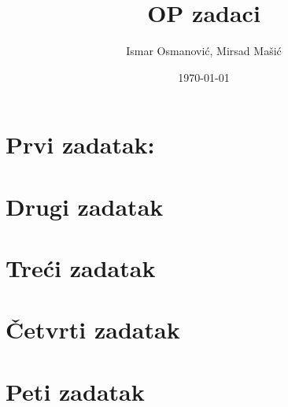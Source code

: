 \documentclass[a4paper, 12pt]{article}
\title{\huge OP zadaci}
\author{Ismar Osmanović, Mirsad Mašić}
\date{\today}
\begin{document}
\maketitle

\section {Prvi zadatak:}


\pagebreak

\section {Drugi zadatak}



\section {Treći zadatak}




\pagebreak

\section {Četvrti zadatak}



\section {Peti zadatak}



\pagebreak
\end{document}

